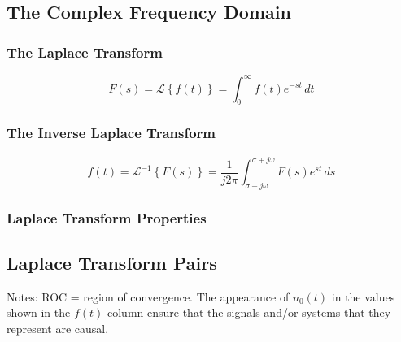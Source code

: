 

\subsection*{The Complex Frequency Domain}

\subsubsection*{The Laplace Transform}
$$
F(s)=\mathcal{L}\left\{f(t)\right\}=\int_0^{\infty} f(t)e^{-st}\, dt
$$
\subsubsection*{The Inverse Laplace Transform}
$$
f(t)=\mathcal{L}^{-1}\left\{F(s)\right\}=\frac{1}{j2\pi}\int_{\sigma-j\omega}^{\sigma+j\omega} F(s)e^{st}\, ds
$$
\subsubsection*{Laplace Transform Properties}



\subsection*{Laplace Transform Pairs}
\label{common-laplace-transform-pairs}



\noindent Notes: ROC = region of convergence. The appearance of $u_0(t)$ in the values shown in the $f(t)$
column ensure that the signals and/or systems that they represent are causal.
